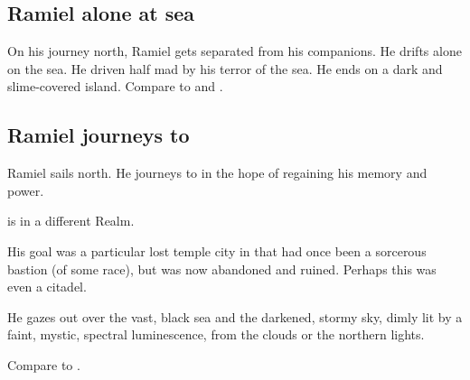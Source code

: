 \subsection{Ramiel alone at sea}
On his journey north, Ramiel gets separated from his companions.
He drifts alone on the sea.
He driven half mad by his terror of the sea.
He ends on a dark and slime-covered island.
Compare to \cite{HPLovecraft:Dagon} and \cite{EdwardPickmanDerby:Azathoth}.









\subsection{Ramiel journeys to \UltimaThule}
Ramiel sails north. 
He journeys to  in the hope of regaining his memory and power. 

\UltimaThule is in a different Realm. 

His goal was a particular lost temple city in \UltimaThule that had once been a sorcerous bastion (of some race), but was now abandoned and ruined.
Perhaps this was even a \voyager citadel.


He gazes out over the vast, black sea and the darkened, stormy sky, dimly lit by a faint, mystic, spectral luminescence, from the clouds or the northern lights. 

Compare to . 

